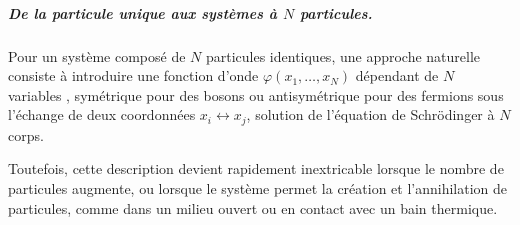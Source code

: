 \subparagraph{De la particule unique aux systèmes à $N$ particules.}

Pour un système composé de $N$ particules identiques, une approche naturelle consiste à introduire une fonction d’onde $\varphi(x_1, \dots, x_N)$ dépendant de $N$ variables , symétrique pour des bosons ou antisymétrique pour des fermions sous l’échange de deux coordonnées $x_i \leftrightarrow x_j$, solution de l’équation de Schrödinger à $N$ corps. %


Toutefois, cette description devient rapidement inextricable lorsque le nombre de particules augmente, ou lorsque le système permet la création et l’annihilation de particules, comme dans un milieu ouvert ou en contact avec un bain thermique.





